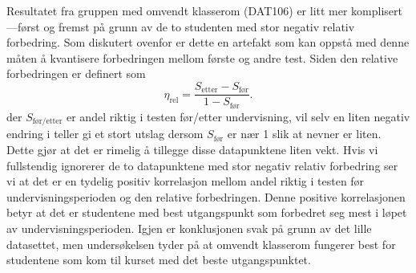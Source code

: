 \documentclass[a4paper,norsk,12pt]{report}
\begin{document}
Resultatet fra gruppen med omvendt klasserom (DAT106) er litt mer komplisert---først og fremst på grunn av de to studenten med stor negativ relativ forbedring. Som diskutert ovenfor er dette en artefakt som kan oppstå med denne måten å kvantisere forbedringen mellom første og andre test. Siden den relative forbedringen er definert som 
\begin{displaymath}
	\eta_\text{rel} = \frac{S_\text{etter}-S_\text{før}}{1 - S_\text{før}}.
\end{displaymath}
der $S_\text{før/etter}$ er andel riktig i testen før/etter undervisning, vil selv en liten negativ endring i teller gi et stort utslag dersom $S_\text{før}$ er nær 1 slik at nevner er liten. Dette gjør at det er rimelig å tillegge disse datapunktene liten vekt. Hvis vi fullstendig ignorerer de to datapunktene med stor negativ relativ forbedring ser vi at det er en tydelig positiv korrelasjon mellom andel riktig i testen før undervisningsperioden og den relative forbedringen. Denne positive korrelasjonen betyr at det er studentene med best utgangspunkt som forbedret seg mest i løpet av undervisningsperioden. Igjen er konklusjonen svak på grunn av det lille datasettet, men undersøkelsen tyder på at omvendt klasserom fungerer best for studentene som kom til kurset med det beste utgangspunktet. 




\end{document}
